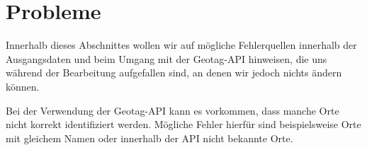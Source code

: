 \section{Probleme}
 \label{sec:Probleme}
 
Innerhalb dieses Abschnittes wollen wir auf mögliche Fehlerquellen innerhalb der Ausgangsdaten und beim Umgang mit der Geotag-API hinweisen, die uns während der Bearbeitung aufgefallen sind, an denen wir jedoch nichts ändern können.

Bei der Verwendung der Geotag-API kann es vorkommen, dass manche Orte nicht korrekt identifiziert werden. Mögliche Fehler hierfür sind beispielsweise Orte mit gleichem Namen oder innerhalb der API nicht bekannte Orte. 